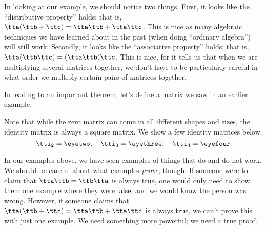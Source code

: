 \medskip

In looking at our example, we should notice two things. First, it looks like the ``distributive property'' holds; that is, $\tta(\ttb+\ttc) = \tta\ttb + \tta\ttc$. This is nice as many algebraic techniques we have learned about in the past (when doing ``ordinary algebra'') will still work. Secondly, it looks like the ``associative property'' holds; that is, $\tta(\ttb\ttc) = (\tta\ttb)\ttc$. This is nice, for it tells us that when we are multiplying several matrices together, we don't have to be particularly careful in what order we multiply certain pairs of matrices together.



In leading to an important theorem, let's define a matrix we saw in an earlier example.


\smallskip


\smallskip

Note that while the zero matrix can come in all different shapes and sizes, the identity matrix is always a square matrix. We show a few identity matrices below. 
\[
\tti_2= \eyetwo ,\quad \tti_3 = \eyethree , \quad \tti_4 = \eyefour
\]

In our examples above, we have seen examples of things that do and do not work. We should be careful about what examples \textit{prove}, though. If someone were to claim that $\tta\ttb = \ttb\tta$ is always true, one would only need to show them one example where they were false, and we would know the person was wrong. However, if someone claims that $\tta(\ttb+\ttc) = \tta\ttb+\tta\ttc$ is always true, we can't prove this with just one example. We need something more powerful; we need a true proof. 

